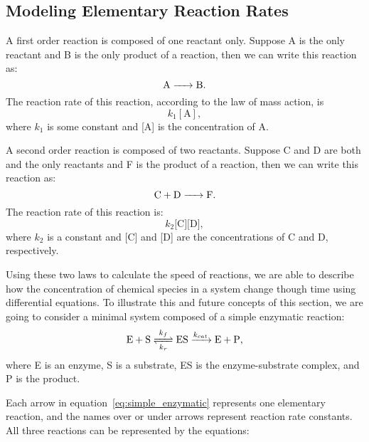 \subsection{Modeling Elementary Reaction Rates}
A first order reaction is composed of one reactant only. Suppose A is 
the only reactant and B is the only product of a reaction, then we can
write this reaction as:
\begin{equation*}
\ce{
    A -> B
}.
\end{equation*}
The reaction rate of this reaction, according to the law of mass 
action, is 
\begin{equation*}
    k_1[\text{A}],
\end{equation*}
where $k_1$ is some constant and [A] is the concentration of A. 

A second order reaction is composed of two reactants. Suppose C and D 
are both and the only reactants and F is the product of a reaction, then
we can write this reaction as:
\begin{equation*}
\ce{
    C + D -> F
}.
\end{equation*}
The reaction rate of this reaction is:
\begin{equation*}
    k_2\text{[C][D]},
\end{equation*}
where $k_2$ is a constant and [C] and [D] are the concentrations of C 
and D, respectively.

Using these two laws to calculate the speed of reactions, we are able 
to describe how the concentration of chemical species in a system change 
though time using differential equations. To illustrate this and future 
concepts of this section, we are going to consider a minimal system 
composed of a simple enzymatic reaction:
\begin{equation}
\ce{
    E + S <=>[\ce{$k$_f}][\ce{$k$_r}] ES ->[\ce{$k_{cat}$}] E + P
},
\label{eq:simple_enzymatic}
\end{equation}
where E is an enzyme, S is a substrate, ES is the enzyme-substrate
complex, and P is the product.

Each arrow in equation~\ref{eq:simple_enzymatic} represents one 
elementary reaction, and the names over or under arrows represent 
reaction rate constants. All three reactions can be represented by the
equations:

